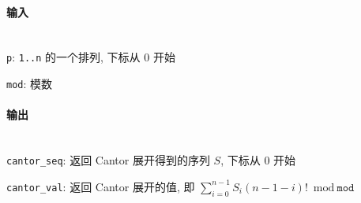 \paragraph{输入}~\\

\verb|p|: \verb|1..n| 的一个排列, 下标从 \(0\) 开始

\verb|mod|: 模数

\paragraph{输出}~\\

\verb|cantor_seq|: 返回 Cantor 展开得到的序列 \(S\), 下标从 \(0\) 开始

\verb|cantor_val|: 返回 Cantor 展开的值, 即 \(\sum_{i=0}^{n-1}S_i(n-1-i)!\bmod \texttt{mod}\)
